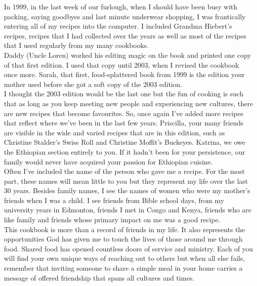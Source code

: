\documentclass[12pt]{memoir} %
\begin{document}
In 1999, in the last week of our furlough, when I should have been busy with   packing, saying goodbyes and last minute underwear shopping, I was frantically entering all of my recipes into the computer. I included Grandma Hiebert's recipes, recipes that I had collected over the years as well as most of the recipes that I used regularly from my many cookbooks. \\[10pt]

Daddy (Uncle Loren) worked his editing magic on the book and printed one copy of that first edition. I used that copy until 2003, when I revised the cookbook once more. Sarah, that first, food-splattered book from 1999 is the edition your mother used before she got a soft copy of the 2003 edition. \\[10pt]

I thought the 2003 edition would be the last one but the fun of cooking is such that as long as you keep meeting new people and experiencing new cultures, there are new recipes that become favourites. So, once again I've added more recipes that reflect where we've been in the last few years. Priscilla, your many friends are visible in the wide and varied recipes that are in this edition, such as Christine Stalder's Swiss Roll and Christine Moffit's Buckeyes. Katrina, we owe the Ethiopian section entirely to you. If it hadn't been for your persistence, our family would never have acquired your passion for Ethiopian cuisine. \\[10pt]

Often I've included the name of the person who gave me a recipe. For the most part, these names will mean little to you but they represent my life over the last 30 years. Besides family names, I see the names of women who were my mother's friends when I was a child. I see friends from Bible school days, from my university years in Edmonton, friends I met in Congo and Kenya, friends who are like family and friends whose primary impact on me was a good recipe. \\[10pt]

This cookbook is more than a record of friends in my life. It also represents the opportunities God has given me to touch the lives of those around me through food. Shared food has opened countless doors of service and ministry. Each of you will find your own unique ways of reaching out to others but when all else fails, remember that inviting someone to share a simple meal in your home carries a message of offered friendship that spans all cultures and times. \\[10pt]
\end{document}
